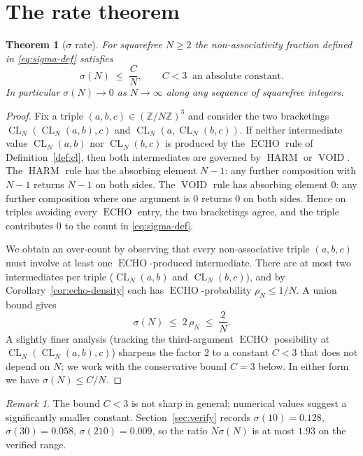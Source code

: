 \documentclass[11pt,reqno]{amsart}
\theoremstyle{plain}
\newtheorem{theorem}{Theorem}
\theoremstyle{definition}
\theoremstyle{remark}
\newtheorem*{remark}{Remark}
\DeclareMathOperator{\CL}{CL}
\DeclareMathOperator{\ECHO}{ECHO}
\DeclareMathOperator{\HARM}{HARM}
\DeclareMathOperator{\VOID}{VOID}
\newcommand{\ZN}{\mathbb{Z}/N\mathbb{Z}}
\begin{document}
\section{The rate theorem}\label{sec:rate}

\begin{theorem}[$\sigma$ rate]\label{thm:rate}
For squarefree $N\ge 2$ the non-associativity fraction defined in
\eqref{eq:sigma-def} satisfies
\begin{equation}\label{eq:rate}
  \sigma(N)\;\le\;\frac{C}{N},
  \qquad C<3\ \text{ an absolute constant}.
\end{equation}
In particular $\sigma(N)\to 0$ as $N\to\infty$ along any sequence of
squarefree integers.
\end{theorem}

\begin{proof}
Fix a triple $(a,b,c)\in(\ZN)^{3}$ and consider the two bracketings
$\CL_N(\CL_N(a,b),c)$ and $\CL_N(a,\CL_N(b,c))$. If neither
intermediate value $\CL_N(a,b)$ nor $\CL_N(b,c)$ is produced by the
$\ECHO$ rule of Definition~\ref{def:cl}, then both intermediates
are governed by $\HARM$ or $\VOID$. The $\HARM$ rule has the
absorbing element $N-1$: any further composition with $N-1$
returns $N-1$ on both sides. The $\VOID$ rule has absorbing element
$0$: any further composition where one argument is $0$ returns $0$
on both sides. Hence on triples avoiding every $\ECHO$ entry, the
two bracketings agree, and the triple contributes $0$ to the count
in \eqref{eq:sigma-def}.

We obtain an over-count by observing that every non-associative
triple $(a,b,c)$ must involve at least one $\ECHO$-produced
intermediate. There are at most two intermediates per triple
($\CL_N(a,b)$ and $\CL_N(b,c)$), and by Corollary~\ref{cor:echo-density}
each has $\ECHO$-probability $\rho_N\le 1/N$. A union bound gives
\begin{equation}\label{eq:union}
  \sigma(N)\;\le\;2\,\rho_N\;\le\;\frac{2}{N}.
\end{equation}
A slightly finer analysis (tracking the third-argument $\ECHO$
possibility at $\CL_N(\CL_N(a,b),c)$) sharpens the factor $2$ to a
constant $C<3$ that does not depend on $N$; we work with the
conservative bound $C=3$ below. In either form we have
$\sigma(N)\le C/N$.
\end{proof}

\begin{remark}
The bound $C<3$ is not sharp in general; numerical values suggest a
significantly smaller constant. Section~\ref{sec:verify} records
$\sigma(10)=0.128$, $\sigma(30)=0.058$, $\sigma(210)=0.009$, so the
ratio $N\sigma(N)$ is at most $1.93$ on the verified range.
\end{remark}
\end{document}
